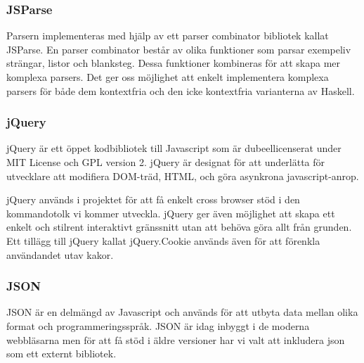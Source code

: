 \subsubsection{JSParse}  
Parsern implementeras med hjälp av ett parser combinator bibliotek kallat JSParse. 
En parser combinator består av olika funktioner som parsar exempeliv strängar, listor och blanksteg.
Dessa funktioner kombineras för att skapa mer komplexa parsers. Det ger oss möjlighet att enkelt implementera komplexa
parsers för både dem kontextfria och den icke kontextfria varianterna av Haskell.

\subsubsection{jQuery} 
jQuery är ett öppet kodbibliotek till Javascript som är dubeellicenserat under MIT License och GPL version 2.  
jQuery är designat för att underlätta för utvecklare att modifiera DOM-träd, HTML, och göra asynkrona javascript-anrop.

jQuery används i projektet för att få enkelt cross browser stöd i den kommandotolk vi kommer utveckla. 
jQuery ger även möjlighet att skapa ett enkelt och stilrent interaktivt gränssnitt utan att behöva göra allt från grunden.
Ett tillägg till jQuery kallat jQuery.Cookie används även för att förenkla användandet utav kakor.

\subsubsection{JSON}
JSON är en delmängd av Javascript och används för att utbyta data mellan olika format och programmeringsspråk. 
JSON är idag inbyggt i de moderna webbläsarna men för att få stöd i äldre versioner har vi valt att inkludera json som ett externt bibliotek.

